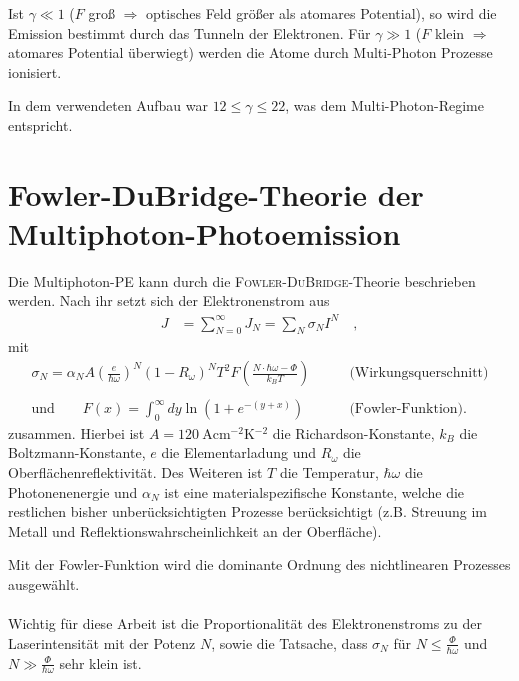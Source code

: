 \documentclass[bachelor,       %
               twoside,        %
               BCOR10mm,       %
               english,ngerman, %
               ]{GAUBM}
\begin{document}
Ist $\gamma\ll 1$ ($F$ groß $\Rightarrow$ optisches Feld gr\"o{\ss}er als atomares Potential), so wird die Emission bestimmt durch das Tunneln der Elektronen.
Für $\gamma\gg 1$ ($F$ klein $\Rightarrow$ atomares Potential \"uberwiegt) werden die Atome durch Multi-Photon Prozesse ionisiert.\newline

In dem verwendeten Aufbau war $12\leq\gamma\leq22$, was dem Multi-Photon-Regime entspricht.\newline\newline



\section{Fowler-DuBridge-Theorie der Multiphoton-Photoemission}
Die Multiphoton-PE kann durch die \textsc{Fowler-DuBridge}-Theorie beschrieben werden\cite{bechtel_1977}\cite{girardeau_1995}.
Nach ihr setzt sich der Elektronenstrom aus
\begin{align}
	J&=\sum_{N=0}^\infty J_N=\sum_N\sigma_NI^N \quad ,\label{eq:photostrom}
\end{align}
mit
\begin{align*}
\sigma_N=\alpha_NA\left(\frac{e}{\hbar\omega}\right)^N(1-R_\omega)^NT^2F\left(\frac{N\cdot \hbar\omega-\Phi}{k_BT}\right)\qquad&\text{(Wirkungsquerschnitt)}\\\\
\text{und}\qquad F(x)=\int_0^\infty dy\ln \left(1+e^{-(y+x)}\right)\qquad &\text{(Fowler-Funktion).}
\end{align*}
zusammen.
Hierbei ist $A=\SI{120}{\A\cm^{-2}\K^{-2}}$ die Richardson-Konstante, $k_B$ die Boltzmann-Konstante, $e$ die Elementarladung und $R_\omega$ die Oberflächenreflektivität.
Des Weiteren ist $T$ die Temperatur, $\hbar\omega$ die Photonenenergie und $\alpha_N$ ist eine materialspezifische Konstante, welche die restlichen bisher unberücksichtigten Prozesse berücksichtigt (z.B. Streuung im Metall und Reflektionswahrscheinlichkeit an der Oberfläche)\cite{brogle}.

Mit der Fowler-Funktion wird die dominante Ordnung des nichtlinearen Prozesses ausgewählt.\\\\

Wichtig für diese Arbeit ist die Proportionalität des Elektronenstroms zu der Laserintensität mit der Potenz $N$, sowie die Tatsache, dass $\sigma_N$ f\"ur $N\leq\frac{\Phi}{\hbar\omega}$ und $N\gg\frac{\Phi}{\hbar\omega}$ sehr klein ist.
\end{document}
